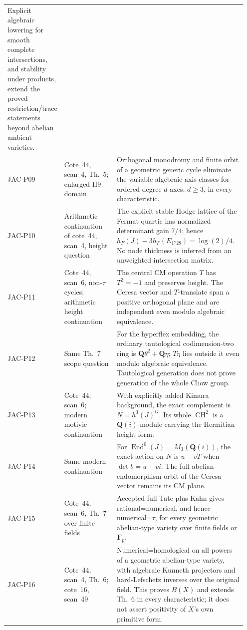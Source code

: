 \documentclass[11pt,a4paper]{article}
\begin{document}
\begin{longtable}{@{}p{0.12\linewidth}p{0.25\linewidth}p{0.58\linewidth}@{}}
Explicit algebraic lowering for smooth complete intersections,
and stability under products, extend the proved restriction/trace
statements beyond abelian ambient varieties.\\
JAC-P09 & Cote~44, scan~4, Th.~5; enlarged H9 domain &
Orthogonal monodromy and finite orbit of a geometric generic
cycle eliminate the variable algebraic axis classes for ordered
degree-$d$ axes, $d\ge3$, in every characteristic.\\
JAC-P10 & Arithmetic continuation of cote~44, scan~4, height question &
The explicit stable Hodge lattice of the Fermat quartic has
normalized determinant gain $7/4$; hence
$h_F(J)-3h_F(E_{1728})=\log(2)/4$. No node thickness is inferred
from an unweighted intersection matrix.\\
JAC-P11 & Cote~44, scan~6, non-$\tau$ cycles; arithmetic height continuation &
The central CM operation $T$ has $T^2=-1$ and preserves height.
The Ceresa vector and $T$-translate span a positive orthogonal
plane and are independent even modulo algebraic equivalence.\\
JAC-P12 & Same Th.~7 scope question &
For the hyperflex embedding, the ordinary tautological
codimension-two ring is $\mathbf Q\theta^2+\mathbf Q\eta$;
$T\eta$ lies outside it even modulo algebraic equivalence.
Tautological generation does not prove generation of the whole Chow group.\\
JAC-P13 & Cote~44, scan~6; modern motivic continuation &
With explicitly added Kimura background, the exact complement is
$N=h^3(J)^G$. Its whole $\operatorname{CH}^2$ is a
$\mathbf Q(i)$-module carrying the Hermitian height form.\\
JAC-P14 & Same modern continuation &
For $\operatorname{End}^0(J)=M_3(\mathbf Q(i))$, the exact action
on $N$ is $u-vT$ when $\det b=u+vi$. The full abelian-endomorphism
orbit of the Ceresa vector remains its CM plane.\\
JAC-P15 & Cote~44, scan~6, Th.~7 over finite fields &
Accepted full Tate plus Kahn gives rational=numerical, and hence
numerical=$\tau$, for every geometric abelian-type variety over
finite fields or $\overline{\mathbf F}_p$.\\
JAC-P16 & Cote~44, scan~4, Th.~6; cote~16, scan~49 &
Numerical=homological on all powers of a geometric abelian-type
variety, with algebraic Kunneth projectors and hard-Lefschetz
inverses over the original field. This proves $B(X)$ and extends
Th.~6 in every characteristic; it does not assert positivity of
$X$'s own primitive form.\\

\end{longtable}
\end{document}
